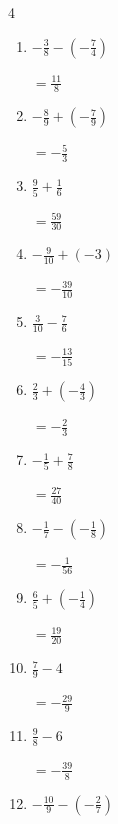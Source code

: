 \begin{multicols}{4}
\begin{enumerate}
        $\displaystyle =-\frac{21}{2}$

  \item $\displaystyle -\frac{3}{8} - \left(-\frac{7}{4}\right)$

        $\displaystyle =\frac{11}{8}$

  \item $\displaystyle -\frac{8}{9} + \left(-\frac{7}{9}\right)$

        $\displaystyle =-\frac{5}{3}$

  \item $\displaystyle \frac{9}{5} + \frac{1}{6}$

        $\displaystyle =\frac{59}{30}$

  \item $\displaystyle -\frac{9}{10} + \left(-3\right)$

        $\displaystyle =-\frac{39}{10}$

  \item $\displaystyle \frac{3}{10} - \frac{7}{6}$

        $\displaystyle =-\frac{13}{15}$

  \item $\displaystyle \frac{2}{3} + \left(-\frac{4}{3}\right)$

        $\displaystyle =-\frac{2}{3}$

  \item $\displaystyle -\frac{1}{5} + \frac{7}{8}$

        $\displaystyle =\frac{27}{40}$

  \item $\displaystyle -\frac{1}{7} - \left(-\frac{1}{8}\right)$

        $\displaystyle =-\frac{1}{56}$

  \item $\displaystyle \frac{6}{5} + \left(-\frac{1}{4}\right)$

        $\displaystyle =\frac{19}{20}$

\columnbreak %

  \item $\displaystyle \frac{7}{9} - 4$

        $\displaystyle =-\frac{29}{9}$

  \item $\displaystyle \frac{9}{8} - 6$

        $\displaystyle =-\frac{39}{8}$

  \item $\displaystyle -\frac{10}{9} - \left(-\frac{2}{7}\right)$


\end{enumerate}
\end{multicols}
